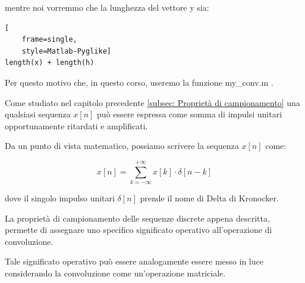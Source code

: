 mentre noi vorremmo che la lunghezza del vettore y sia: 

{
    \Large 
    \begin{lstlisting}[
    frame=single,
    style=Matlab-Pyglike]
length(x) + length(h) 
\end{lstlisting}
} 

Per questo motivo che, in questo corso, useremo la funzione my\_conv.m .\newline 

Come studiato nel capitolo precedente \ref{subsec: Proprietà di campionamento}  
una qualsiasi sequenza $x \left[ n \right]$ può essere espressa come somma di impulsi unitari 
opportunamente ritardati e amplificati. \newline 

Da un punto di vista matematico, possiamo scrivere la sequenza $x \left[ n \right]$ come: 

{
    \Large 
    \begin{equation}
        x \left[ n \right] 
        = 
        \sum_{k = - \infty}^{+ \infty }
        x \left[ k \right] \cdot \delta \left[ n - k \right]
    \end{equation}
}

dove il singolo impulso unitari $\delta \left[ n\right]$ prende il nome di Delta di Kronocker. \newline 

La proprietà di campionamento delle sequenze discrete appena descritta, permette di assegnare uno specifico significato operativo all'operazione di convoluzione. \newline 

Tale significato operativo può essere analogamente essere messo in luce considerando la convoluzione come un'operazione matriciale. \newline 

